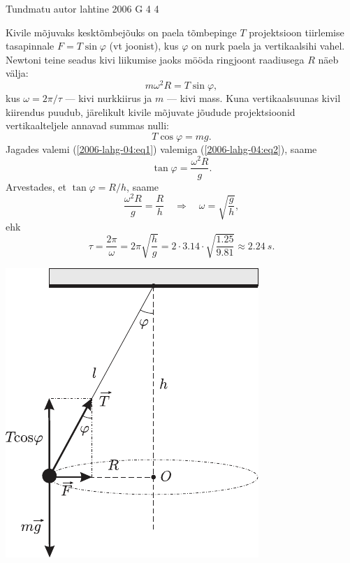 \documentclass[11pt]{article}
\begin{document}
{%
{Tundmatu autor} %
{lahtine} %
{2006} %
{G 4} %
{4} %
{

\ifSolution
Kivile mõjuvaks kesktõmbejõuks on paela tõmbepinge $T$ projektsioon tiirlemise
tasapinnale $F = T \sin \varphi$ (vt joonist), kus $\varphi$ on nurk paela ja vertikaalsihi vahel. Newtoni teine seadus kivi liikumise jaoks mööda ringjoont raadiusega $R$ näeb välja:
\begin{equation} \label{2006-lahg-04:eq1}
m\omega^2R = T \sin \varphi,
\end{equation}
kus $\omega = 2\pi /\tau$ --- kivi nurkkiirus ja $m$ --- kivi mass. Kuna vertikaalsuunas kivil kiirendus puudub, järelikult kivile mõjuvate jõudude projektsioonid vertikaalteljele annavad summas nulli:
\begin{equation} \label{2006-lahg-04:eq2}
T \cos\varphi = mg.
\end{equation}
Jagades valemi (\ref{2006-lahg-04:eq1}) valemiga (\ref{2006-lahg-04:eq2}), saame
\[
\tan \varphi = \frac{\omega^2R}{g}.
\]
Arvestades, et $\tan \varphi = R/h$, saame
\[
\frac{\omega^{2} R}{g}=\frac{R}{h} \quad \Rightarrow \quad \omega=\sqrt{\frac{g}{h}},
\]
ehk
\[
\tau=\frac{2 \pi}{\omega}=2 \pi \sqrt{\frac{h}{g}}=2 \cdot \num{3,14} \cdot \sqrt{\frac{\num{1,25}}{\num{9,81}}} \approx \SI{2,24}{s}.
\]

\begin{center}
	\includegraphics[width=0.7\linewidth]{2006-lahg-04-lah}
\end{center}
\fi
}

}
\end{document}
